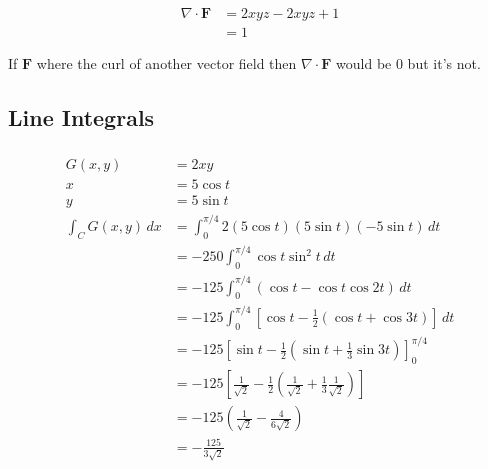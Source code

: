 \documentclass{article}
\begin{document}
\setcounter{subsubsection}{44}
\subsubsection{}

\begin{align*}
  \nabla \cdot \mathbf{F} & = 2 x y z  - 2 x y z + 1 \\
                          & = 1
\end{align*}

If $\mathbf{F}$ where the curl of another vector field then $\nabla \cdot \mathbf{F}$ would be $0$ but it's not.

\subsection{Line Integrals}

\subsubsection{}

\begin{align*}
  G(x, y)             & = 2 x y                                                                                                                   \\
  x                   & = 5 \cos t                                                                                                                \\
  y                   & = 5 \sin t                                                                                                                \\
  \int_C G(x, y) \,dx & = \int_0^{\pi / 4} 2 (5 \cos t) (5 \sin t) (-5 \sin t) \,dt                                                               \\
                      & = -250 \int_0^{\pi / 4} \cos t \sin^2 t \,dt                                                                              \\
                      & = -125 \int_0^{\pi / 4} (\cos t - \cos t \cos 2 t) \,dt                                                                   \\
                      & = -125 \int_0^{\pi / 4} \left[ \cos t - \frac{1}{2} (\cos t + \cos 3 t) \right] \,dt                                      \\
                      & = -125 \left[ \sin t - \frac{1}{2} \left( \sin t + \frac{1}{3} \sin 3 t \right) \right]_0^{\pi / 4}                       \\
                      & = -125 \left[ \frac{1}{\sqrt{2}} - \frac{1}{2} \left( \frac{1}{\sqrt{2}} + \frac{1}{3} \frac{1}{\sqrt{2}} \right) \right] \\
                      & = -125 \left( \frac{1}{\sqrt{2}} - \frac{4}{6 \sqrt{2}} \right)                                                           \\
                      & = -\frac{125}{3 \sqrt{2}}
\end{align*}
\end{document}
